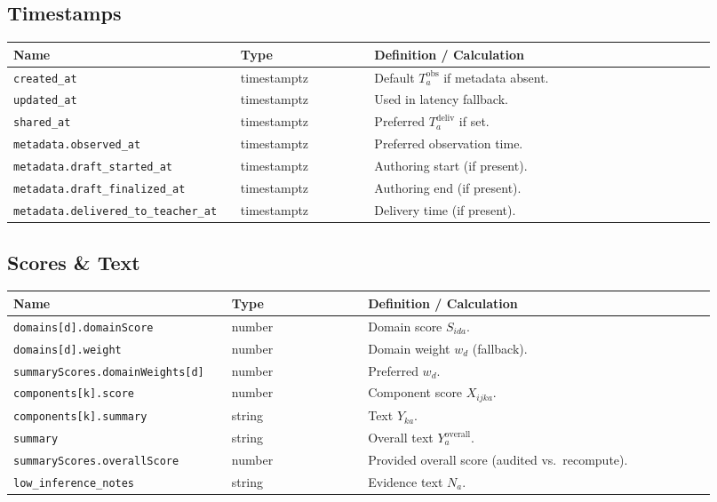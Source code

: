 \documentclass[11pt]{article}
\begin{document}
\subsection*{Timestamps}
\begin{longtable}{@{}p{0.28\linewidth}p{0.18\linewidth}p{0.46\linewidth}@{}}
\toprule
\textbf{Name} & \textbf{Type} & \textbf{Definition / Calculation} \\
\midrule
\endhead
\texttt{created\_at} & timestamptz & Default $T^{\mathrm{obs}}_a$ if metadata absent. \\
\texttt{updated\_at} & timestamptz & Used in latency fallback. \\
\texttt{shared\_at} & timestamptz & Preferred $T^{\mathrm{deliv}}_a$ if set. \\
\texttt{metadata.observed\_at} & timestamptz & Preferred observation time. \\
\texttt{metadata.draft\_started\_at} & timestamptz & Authoring start (if present). \\
\texttt{metadata.draft\_finalized\_at} & timestamptz & Authoring end (if present). \\
\texttt{metadata.delivered\_to\_teacher\_at} & timestamptz & Delivery time (if present). \\
\bottomrule
\end{longtable}

\subsection*{Scores \& Text}
\begin{longtable}{@{}p{0.28\linewidth}p{0.18\linewidth}p{0.46\linewidth}@{}}
\toprule
\textbf{Name} & \textbf{Type} & \textbf{Definition / Calculation} \\
\midrule
\endhead
\texttt{domains[d].domainScore} & number & Domain score $S_{i d a}$. \\
\texttt{domains[d].weight} & number & Domain weight $w_d$ (fallback). \\
\texttt{summaryScores.domainWeights[d]} & number & Preferred $w_d$. \\
\texttt{components[k].score} & number & Component score $X_{i j k a}$. \\
\texttt{components[k].summary} & string & Text $Y_{k a}$. \\
\texttt{summary} & string & Overall text $Y^{\mathrm{overall}}_a$. \\
\texttt{summaryScores.overallScore} & number & Provided overall score (audited vs.\ recompute). \\
\texttt{low\_inference\_notes} & string & Evidence text $N_a$. \\
\bottomrule
\end{longtable}
\end{document}
